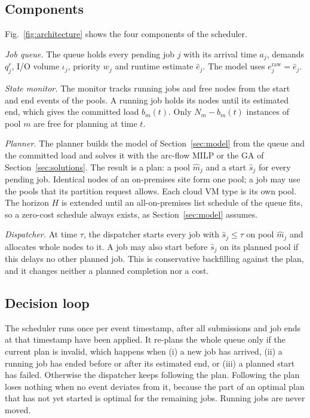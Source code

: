 \subsection{Components}
\label{sec:arch-components}

Fig.~\ref{fig:architecture} shows the four components of the scheduler.

\emph{Job queue.} The queue holds every pending job $j$ with its arrival
time $a_j$, demands $q_j^r$, I/O volume $\iota_j$, priority $w_j$ and runtime
estimate $\hat e_j$. The model uses $e^{\mathrm{raw}}_j=\hat e_j$.

\emph{State monitor.} The monitor tracks running jobs and free nodes from the
start and end events of the pools. A running job holds its nodes until its
estimated end, which gives the committed load $b_m(t)$. Only $N_m-b_m(t)$
instances of pool $m$ are free for planning at time $t$.

\emph{Planner.} The planner builds the model of Section~\ref{sec:model} from
the queue and the committed load and solves it with the arc-flow MILP or the
GA of Section~\ref{sec:solutions}. The result is a plan: a pool $\hat m_j$ and a
start $\hat s_j$ for every pending job. Identical nodes of an on-premises
site form one pool; a job may use the pools that its partition request
allows. Each cloud VM type is its own pool. The horizon $H$ is extended until
an all-on-premises list schedule of the queue fits, so a zero-cost schedule
always exists, as Section~\ref{sec:model} assumes.

\emph{Dispatcher.} At time $\tau$, the dispatcher starts every job with
$\hat s_j\le\tau$ on pool $\hat m_j$ and allocates whole nodes to it. A job
may also start before $\hat s_j$ on its planned pool if this delays no other
planned job. This is conservative backfilling against the plan, and it
changes neither a planned completion nor a cost.

\subsection{Decision loop}
\label{sec:arch-loop}

The scheduler runs once per event timestamp, after all submissions and job
ends at that timestamp have been applied. It re-plans the whole queue only
if the current plan is invalid, which happens when (i) a new job has
arrived, (ii) a running job has ended before or after its estimated end, or
(iii) a planned start has failed. Otherwise the dispatcher keeps following
the plan. Following the plan loses nothing when no event deviates from it,
because the part of an optimal plan that has not yet started is optimal for
the remaining jobs. Running jobs are never moved.

